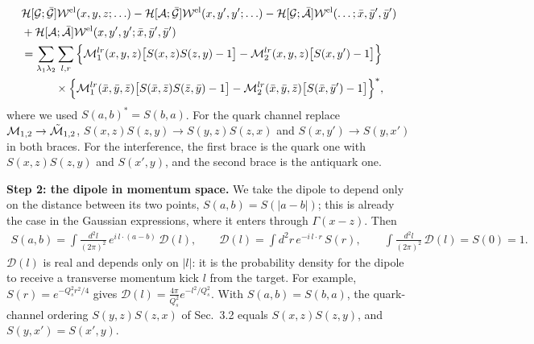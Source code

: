 \documentclass[9pt]{article}
\numberwithin{equation}{section}
\begin{document}
\begin{align}\label{eq:elcomb}
& \mathcal{H}[\mathcal{G};\Bar{\mathcal{G}}]\mathcal{W}^{\text{el}}(x,y,z;\ldots)-\mathcal{H}[\mathcal{A};\Bar{\mathcal{G}}]\mathcal{W}^{\text{el}}(x,y',y';\ldots)-\mathcal{H}[\mathcal{G};\Bar{\mathcal{A}}]\mathcal{W}^{\text{el}}(\ldots;\Bar{x},\Bar{y}',\Bar{y}')\notag \\
& +\mathcal{H}[\mathcal{A};\Bar{\mathcal{A}}]\mathcal{W}^{\text{el}}(x,y',y';\Bar{x},\Bar{y}',\Bar{y}')\notag \\
& = \sum_{\lambda_{1}\lambda_{2}}\sum_{l,r}\Big\{\mathcal{M}^{lr}_{1}(x,y,z)\big[S(x,z)S(z,y)-1\big]-\mathcal{M}^{lr}_{2}(x,y,z)\big[S(x,y')-1\big]\Big\}\notag \\
& \hspace{3em}\times\Big\{\mathcal{M}^{lr}_{1}(\Bar{x},\Bar{y},\Bar{z})\big[S(\Bar{x},\Bar{z})S(\Bar{z},\Bar{y})-1\big]-\mathcal{M}^{lr}_{2}(\Bar{x},\Bar{y},\Bar{z})\big[S(\Bar{x},\Bar{y}')-1\big]\Big\}^{*},
\end{align}
where we used $S(a,b)^{*}=S(b,a)$. For the quark channel replace $\mathcal{M}_{1,2}\rightarrow\Tilde{\mathcal{M}}_{1,2}$, $S(x,z)S(z,y)\rightarrow S(y,z)S(z,x)$ and $S(x,y')\rightarrow S(y,x')$ in both braces. For the interference, the first brace is the quark one with $S(x,z)S(z,y)$ and $S(x',y)$, and the second brace is the antiquark one.

\noindent\textbf{Step 2: the dipole in momentum space.} We take the dipole to depend only on the distance between its two points, $S(a,b)=S(|a-b|)$; this is already the case in the Gaussian expressions, where it enters through $\Gamma(x-z)$. Then
\begin{align}\label{eq:Dl}
S(a,b) = \int\frac{d^{2}l}{(2\pi)^{2}}\,e^{i\,l\cdot(a-b)}\,\mathcal{D}(l),\hspace{2em} \mathcal{D}(l) = \int d^{2}r\,e^{-i\,l\cdot r}\,S(r),\hspace{2em} \int\frac{d^{2}l}{(2\pi)^{2}}\,\mathcal{D}(l) = S(0) = 1 .
\end{align}
$\mathcal{D}(l)$ is real and depends only on $|l|$: it is the probability density for the dipole to receive a transverse momentum kick $l$ from the target. For example, $S(r)=e^{-Q^{2}_{s}r^{2}/4}$ gives $\mathcal{D}(l)=\frac{4\pi}{Q^{2}_{s}}e^{-l^{2}/Q^{2}_{s}}$. With $S(a,b)=S(b,a)$, the quark-channel ordering $S(y,z)S(z,x)$ of Sec.~3.2 equals $S(x,z)S(z,y)$, and $S(y,x')=S(x',y)$.
\end{document}
